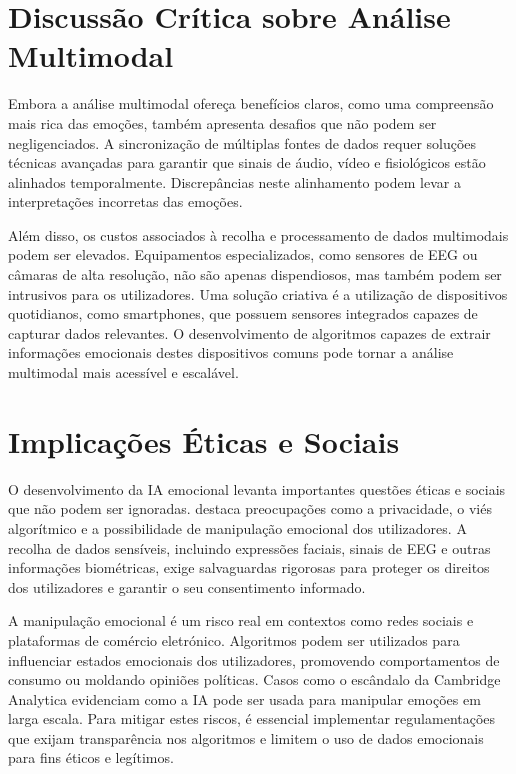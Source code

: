 \documentclass[a4paper,12pt]{report}
\begin{document}
	\section{Discussão Crítica sobre Análise Multimodal}
	
	Embora a análise multimodal ofereça benefícios claros, como uma compreensão mais rica das emoções, também apresenta desafios que não podem ser negligenciados. A sincronização de múltiplas fontes de dados requer soluções técnicas avançadas para garantir que sinais de áudio, vídeo e fisiológicos estão alinhados temporalmente. Discrepâncias neste alinhamento podem levar a interpretações incorretas das emoções.
	
	Além disso, os custos associados à recolha e processamento de dados multimodais podem ser elevados. Equipamentos especializados, como sensores de EEG ou câmaras de alta resolução, não são apenas dispendiosos, mas também podem ser intrusivos para os utilizadores. Uma solução criativa é a utilização de dispositivos quotidianos, como smartphones, que possuem sensores integrados capazes de capturar dados relevantes. O desenvolvimento de algoritmos capazes de extrair informações emocionais destes dispositivos comuns pode tornar a análise multimodal mais acessível e escalável.
	
	\section{Implicações Éticas e Sociais}
	
	O desenvolvimento da IA emocional levanta importantes questões éticas e sociais que não podem ser ignoradas. \textcite{mueller2020} destaca preocupações como a privacidade, o viés algorítmico e a possibilidade de manipulação emocional dos utilizadores. A recolha de dados sensíveis, incluindo expressões faciais, sinais de EEG e outras informações biométricas, exige salvaguardas rigorosas para proteger os direitos dos utilizadores e garantir o seu consentimento informado.
	
	A manipulação emocional é um risco real em contextos como redes sociais e plataformas de comércio eletrónico. Algoritmos podem ser utilizados para influenciar estados emocionais dos utilizadores, promovendo comportamentos de consumo ou moldando opiniões políticas. Casos como o escândalo da Cambridge Analytica evidenciam como a IA pode ser usada para manipular emoções em larga escala. Para mitigar estes riscos, é essencial implementar regulamentações que exijam transparência nos algoritmos e limitem o uso de dados emocionais para fins éticos e legítimos.
	
\end{document}

